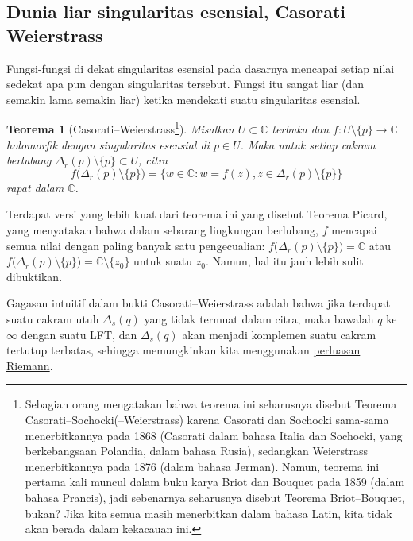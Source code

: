 \documentclass[12pt,openany]{book}
\newcommand{\C}{{\mathbb{C}}}
\theoremstyle{plain}
\newtheorem{thm}{Teorema}[section]
\theoremstyle{remark}
\theoremstyle{definition}
\theoremstyle{exercise}
\theoremstyle{example}
\begin{document}
\subsection{Dunia liar singularitas esensial, Casorati--Weierstrass}

Fungsi-fungsi di dekat singularitas esensial pada dasarnya mencapai setiap nilai
sedekat apa pun dengan singularitas tersebut. Fungsi itu sangat liar (dan
semakin lama semakin liar) ketika mendekati suatu singularitas esensial.

\begin{thm}[Casorati--Weierstrass\footnote{%
Sebagian orang mengatakan bahwa teorema ini seharusnya disebut Teorema Casorati--Sochocki(--Weierstrass) karena
Casorati dan Sochocki sama-sama menerbitkannya pada 1868 (Casorati dalam bahasa Italia
dan Sochocki, yang berkebangsaan Polandia, dalam bahasa Rusia),
sedangkan Weierstrass menerbitkannya pada 1876 (dalam
bahasa Jerman). Namun, teorema ini pertama kali muncul dalam buku karya Briot dan Bouquet pada
1859 (dalam bahasa Prancis), jadi sebenarnya seharusnya disebut Teorema Briot--Bouquet,
bukan? Jika kita semua masih menerbitkan dalam bahasa Latin, kita tidak akan berada dalam
kekacauan ini.}]\label{thm:casoratiweierstrass}
Misalkan $U \subset \C$ terbuka dan $f \colon U \setminus \{ p \} \to \C$
holomorfik dengan
singularitas esensial di $p \in U$. Maka untuk setiap cakram berlubang
$\Delta_r(p) \setminus \{ p \} \subset U$, citra
\begin{equation*}
f\bigl(\Delta_r(p) \setminus \{ p \} \bigr)
=
\bigl\{ w \in \C : w = f(z), z \in \Delta_r(p) \setminus \{ p \} \bigr\}
\end{equation*}
rapat dalam $\C$.
\end{thm}

Terdapat versi yang lebih kuat
dari teorema ini yang disebut Teorema Picard, yang menyatakan bahwa dalam sebarang
lingkungan berlubang, $f$ mencapai semua nilai dengan paling banyak satu pengecualian:
$f\bigl(\Delta_r(p) \setminus \{ p \} \bigr) = \C$ atau
$f\bigl(\Delta_r(p) \setminus \{ p \} \bigr) = \C \setminus \{ z_0 \}$ untuk
suatu $z_0$.
Namun, hal itu jauh lebih sulit dibuktikan.

Gagasan intuitif dalam bukti Casorati--Weierstrass adalah bahwa jika terdapat
suatu cakram utuh $\Delta_s(q)$ yang tidak termuat dalam citra, maka bawalah $q$ ke
$\infty$ dengan suatu LFT, dan $\Delta_s(q)$ akan menjadi komplemen suatu cakram
tertutup terbatas, sehingga memungkinkan kita menggunakan
\hyperref[thm:riemannext]{perluasan Riemann}.
\end{document}
